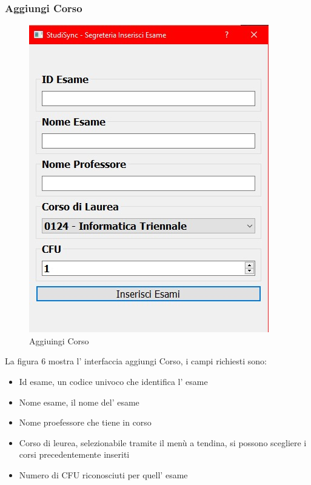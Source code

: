 \documentclass{article}
\begin{document}
\subsubsection{Aggiungi Corso}
\begin{figure}
    \centering
    \includegraphics[width=0.75\linewidth]{IMG/aggiungiEsame.jpg}
    \caption{Aggiuingi Corso}
    \label{fig:enter-label}
\end{figure}

La figura 6 mostra l' interfaccia aggiungi Corso, i campi richiesti sono:
\begin{itemize}
    \item Id esame, un codice univoco che identifica l' esame
    \item Nome esame, il nome del' esame
    \item Nome proefessore che tiene in corso
    \item  Corso di leurea, selezionabile tramite il menù a tendina, si possono scegliere i corsi precedentemente inseriti 
    \item Numero di CFU riconosciuti per quell' esame
\end{itemize}
\end{document}
